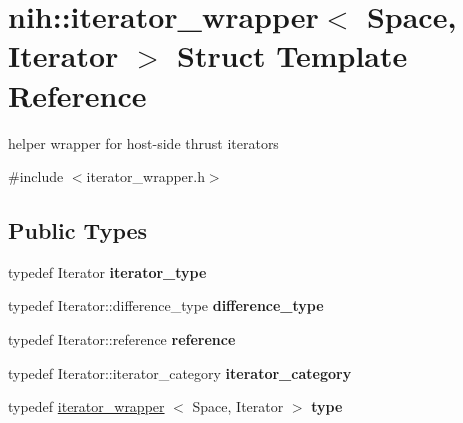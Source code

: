 \hypertarget{structnih_1_1iterator__wrapper}{
\section{nih\-:\-:iterator\-\_\-wrapper$<$ \-Space, \-Iterator $>$ \-Struct \-Template \-Reference}
\label{structnih_1_1iterator__wrapper}
}


helper wrapper for host-\/side thrust iterators  




{\ttfamily \#include $<$iterator\-\_\-wrapper.\-h$>$}

\subsection*{\-Public \-Types}
\begin{DoxyCompactItemize}
\item 
\hypertarget{structnih_1_1iterator__wrapper_a5cce4c7a42ff56dff906e06e2424a614}{
typedef \-Iterator {\bfseries iterator\-\_\-type}}
\label{structnih_1_1iterator__wrapper_a5cce4c7a42ff56dff906e06e2424a614}

\item 
\hypertarget{structnih_1_1iterator__wrapper_a3fc96f0aa64d8eb41bf53a15c48ca921}{
typedef \-Iterator\-::difference\-\_\-type {\bfseries difference\-\_\-type}}
\label{structnih_1_1iterator__wrapper_a3fc96f0aa64d8eb41bf53a15c48ca921}

\item 
\hypertarget{structnih_1_1iterator__wrapper_a0449669b1f8b5c7d2f8e49d13176835b}{
typedef \-Iterator\-::reference {\bfseries reference}}
\label{structnih_1_1iterator__wrapper_a0449669b1f8b5c7d2f8e49d13176835b}

\item 
\hypertarget{structnih_1_1iterator__wrapper_ae9d5db91b3b835405c54c28869c35420}{
typedef \-Iterator\-::iterator\-\_\-category {\bfseries iterator\-\_\-category}}
\label{structnih_1_1iterator__wrapper_ae9d5db91b3b835405c54c28869c35420}

\item 
\hypertarget{structnih_1_1iterator__wrapper_a15f094acd2ec1deda4f84d38a2031b9a}{
typedef \hyperlink{structnih_1_1iterator__wrapper}{iterator\-\_\-wrapper}\*
$<$ \-Space, \-Iterator $>$ {\bfseries type}}
\label{structnih_1_1iterator__wrapper_a15f094acd2ec1deda4f84d38a2031b9a}

\end{DoxyCompactItemize}
